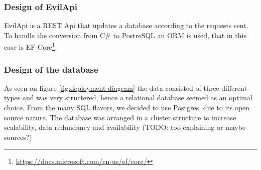 \documentclass[report/main.tex]{subfiles}
\begin{document}
        \subsubsection{Design of EvilApi}
        \label{subsubsec:architecture-of-evilApi}
            EvilApi is a REST \cite{rest} Api that updates a database according to the requests sent. To handle the conversion from C\# to PostreSQL an ORM is used, that in this case is EF Core\footnote{\hyperlink{https://docs.microsoft.com/en-us/ef/core/}{https://docs.microsoft.com/en-us/ef/core/}}.
        
        \subsubsection{Design of the database}
        \label{subsubsec:design-of-the-database}
            As seen on figure \ref{fig:deployment-diagram} the data consisted of three different types and was very structered, hence a relational database seemed as an optimal choice. From the many SQL flavors, we decided to use Postgres, due to its open source nature. The database was arranged in a cluster structure to increase scalability, data redundancy and availability (TODO: too explaining or maybe sources?)
    
    \newpage
    
\end{document}
